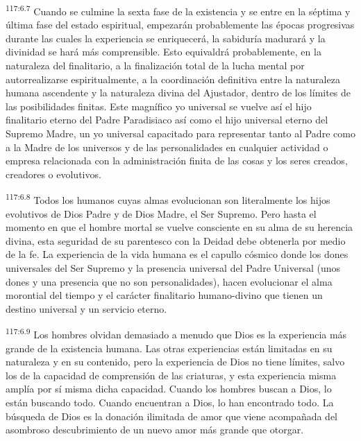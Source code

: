 \par
\textsuperscript{117:6.7} Cuando se culmine la sexta fase de la existencia y se entre en la séptima y última fase del estado espiritual, empezarán probablemente las épocas progresivas durante las cuales la experiencia se enriquecerá, la sabiduría madurará y la divinidad se hará más comprensible. Esto equivaldrá probablemente, en la naturaleza del finalitario, a la finalización total de la lucha mental por autorrealizarse espiritualmente, a la coordinación definitiva entre la naturaleza humana ascendente y la naturaleza divina del Ajustador, dentro de los límites de las posibilidades finitas. Este magnífico yo universal se vuelve así el hijo finalitario eterno del Padre Paradisiaco así como el hijo universal eterno del Supremo Madre, un yo universal capacitado para representar tanto al Padre como a la Madre de los universos y de las personalidades en cualquier actividad o empresa relacionada con la administración finita de las cosas y los seres creados, creadores o evolutivos.

\par
\textsuperscript{117:6.8} Todos los humanos cuyas almas evolucionan son literalmente los hijos evolutivos de Dios Padre y de Dios Madre, el Ser Supremo. Pero hasta el momento en que el hombre mortal se vuelve consciente en su alma de su herencia divina, esta seguridad de su parentesco con la Deidad debe obtenerla por medio de la fe. La experiencia de la vida humana es el capullo cósmico donde los dones universales del Ser Supremo y la presencia universal del Padre Universal (unos dones y una presencia que no son personalidades), hacen evolucionar el alma morontial del tiempo y el carácter finalitario humano-divino que tienen un destino universal y un servicio eterno.

\par
\textsuperscript{117:6.9} Los hombres olvidan demasiado a menudo que Dios es la experiencia más grande de la existencia humana. Las otras experiencias están limitadas en su naturaleza y en su contenido, pero la experiencia de Dios no tiene límites, salvo los de la capacidad de comprensión de las criaturas, y esta experiencia misma amplía por sí misma dicha capacidad. Cuando los hombres buscan a Dios, lo están buscando todo. Cuando encuentran a Dios, lo han encontrado todo. La búsqueda de Dios es la donación ilimitada de amor que viene acompañada del asombroso descubrimiento de un nuevo amor más grande que otorgar.


